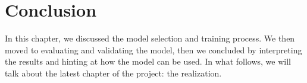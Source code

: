 
\setcounter{secnumdepth}{0} %
\section{Conclusion}
In this chapter, we discussed the model selection and training process.
We then moved to evaluating and validating the model, then we concluded by interpreting the results and hinting at how the model can be used.
In what follows, we will talk about the latest chapter of the project: the realization.
